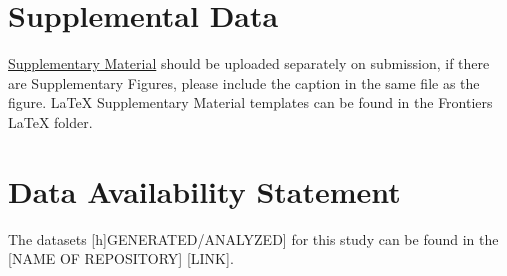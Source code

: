 \documentclass[11pt, oneside]{article}   	%
\begin{document}
\section*{Supplemental Data}
 \href{http://home.frontiersin.org/about/author-guidelines#SupplementaryMaterial}{Supplementary Material} should be uploaded separately on submission, if there are Supplementary Figures, please include the caption in the same file as the figure. LaTeX Supplementary Material templates can be found in the Frontiers LaTeX folder.

\section*{Data Availability Statement}
The datasets [h]GENERATED/ANALYZED] for this study can be found in the [NAME OF REPOSITORY] [LINK].



\end{document}
